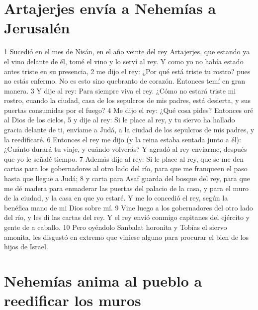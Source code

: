\section*{Artajerjes envía a Nehemías a Jerusalén}


1 Sucedió en el mes de Nisán, en el año veinte del rey Artajerjes, que estando ya el vino delante de él, tomé el vino y lo serví al rey. Y como yo no había estado antes triste en su presencia,
2 me dijo el rey: ¿Por qué está triste tu rostro? pues no estás enfermo. No es esto sino quebranto de corazón. Entonces temí en gran manera.
3 Y dije al rey: Para siempre viva el rey. ¿Cómo no estará triste mi rostro, cuando la ciudad, casa de los sepulcros de mis padres, está desierta, y sus puertas consumidas por el fuego? 
4 Me dijo el rey: ¿Qué cosa pides? Entonces oré al Dios de los cielos,
5 y dije al rey: Si le place al rey, y tu siervo ha hallado gracia delante de ti, envíame a Judá, a la ciudad de los sepulcros de mis padres, y la reedificaré.
6 Entonces el rey me dijo (y la reina estaba sentada junto a él): ¿Cuánto durará tu viaje, y cuándo volverás? Y agradó al rey enviarme, después que yo le señalé tiempo.
7 Además dije al rey: Si le place al rey, que se me den cartas para los gobernadores al otro lado del río, para que me franqueen el paso hasta que llegue a Judá;
8 y carta para Asaf guarda del bosque del rey, para que me dé madera para enmaderar las puertas del palacio de la casa, y para el muro de la ciudad, y la casa en que yo estaré. Y me lo concedió el rey, según la benéfica mano de mi Dios sobre mí.
9 Vine luego a los gobernadores del otro lado del río, y les di las cartas del rey. Y el rey envió conmigo capitanes del ejército y gente de a caballo.
10 Pero oyéndolo Sanbalat horonita y Tobías el siervo amonita, les disgustó en extremo que viniese alguno para procurar el bien de los hijos de Israel.
\section*{Nehemías anima al pueblo a reedificar los muros}

